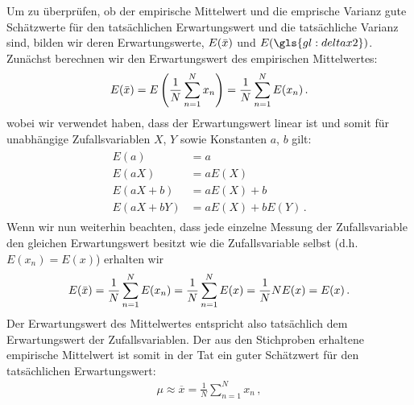 Um zu überprüfen, ob der empirische Mittelwert und die emprische Varianz gute Schätzwerte für den tatsächlichen Erwartungswert und die tatsächliche Varianz sind, bilden wir deren Erwartungswerte, $E(\Bar{x})$ und $E(\gls{gl:deltax2})$.  Zunächst berechnen wir den Erwartungswert des empirischen Mittelwertes:
\begin{align}
E(\Bar{x}) = E \left( \frac{1}{N} \sum_{n = 1}^N x_n \right) = \frac{1}{N} \sum_{n = 1}^N E(x_n)\,.
\end{align}
wobei wir verwendet haben, dass der Erwartungswert linear ist und somit für unabhängige Zufallsvariablen $X$, $Y$ sowie Konstanten $a$, $b$ gilt:
\begin{align}
\begin{split}
E(a) &= a\\
E(aX) &= a E(X)\\
E(aX + b) &= a E(X) + b\\
E(aX + bY) &= a E(X) + b E(Y)\,.
\end{split}
\end{align}
Wenn wir nun weiterhin beachten, dass jede einzelne Messung der Zufallsvariable den gleichen Erwartungswert besitzt wie die Zufallsvariable selbst (d.h. $E(x_n) = E(x)$) erhalten wir
\begin{align}
E(\Bar{x}) = \frac{1}{N} \sum_{n = 1}^N E(x_n)= \frac{1}{N} \sum_{n = 1}^N E(x) = \frac{1}{N} N E(x) = E(x)\,.
\end{align}
Der Erwartungswert des Mittelwertes entspricht also tatsächlich dem Erwartungswert der Zufallsvariablen. Der aus den Stichproben erhaltene empirische Mittelwert ist somit in der Tat ein guter Schätzwert für den tatsächlichen Erwartungswert:
\begin{align}
\mu \approx \overline{x} = \frac{1}{N} \sum^N_{n = 1} x_n\,,
\end{align}

